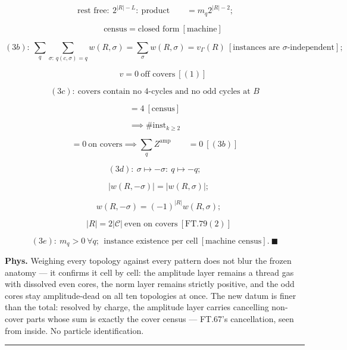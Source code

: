 \begin{theorem}
\[
\ \text{rest free}:\ 2^{|R|-L}:\ \text{product}\qquad = m_q2^{|R|-2};
\]

\[
\qquad \text{census}=\text{closed form}\ [\text{machine}]
\]

\[
(3b):\ \sum_q\sum_{\sigma:\,q(c,\sigma)=q}w(R,\sigma)=\sum_\sigma w(R,\sigma)=v_\Gamma(R)\ [\text{instances are }\sigma\text{-independent}];
\]

\[
\qquad v=0\ \text{off covers}\ [(1)]
\]

\[
(3c):\ \text{covers contain no 4-cycles and no odd cycles at }B
\]

\[
= 4\ [\text{census}]
\]

\[
\implies \#\mathrm{inst}_{k\ge2}
\]

\[
= 0\ \text{on covers}\implies\sum_qZ^{\mathrm{amp}}\qquad = 0\ [(3b)]
\]

\[
(3d):\ \sigma\mapsto-\sigma:\ q\mapsto-q;
\]

\[
\quad |w(R,-\sigma)|=|w(R,\sigma)|;
\]

\[
\quad w(R,-\sigma)=(-1)^{|R|}w(R,\sigma);
\]

\[
\quad |R|=2|\mathcal C|\ \text{even on covers}\ [\mathrm{FT.79}(2)]
\]

\[
(3e):\ m_q>0\ \forall q;\ \ \text{instance existence per cell}\ [\text{machine census}].\ \blacksquare
\]

\textbf{Phys.} Weighing every topology against every pattern does not blur the frozen anatomy — it confirms it cell by cell: the amplitude layer remains a thread gas with dissolved even cores, the norm layer remains strictly positive, and the odd cores stay amplitude-dead on all ten topologies at once. The new datum is finer than the total: resolved by charge, the amplitude layer carries cancelling non-cover parts whose sum is exactly the cover census — FT.67's cancellation, seen from inside. No particle identification.

\vspace{2pt}\noindent\rule{\textwidth}{0.4pt}\vspace{2pt}

\end{theorem}

